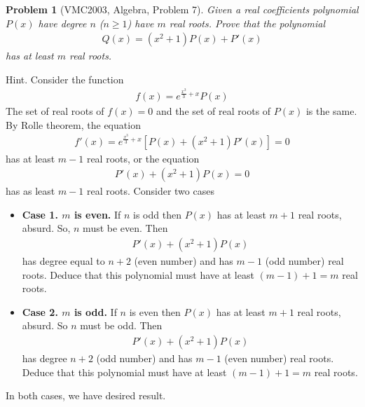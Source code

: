 \documentclass{article}
\newtheorem{problem}{Problem}
\begin{document}
\begin{problem}[VMC2003, Algebra, Problem 7]
	Given a real coefficients polynomial $P(x)$ have degree $n$ ($n \ge 1$) have $m$ real roots. Prove that the polynomial
	\begin{align}
		Q\left( x \right) = \left( {{x^2} + 1} \right)P\left( x \right) + P'\left( x \right)
	\end{align}
	has at least $m$ real roots.
\end{problem}
{\sf Hint.} Consider the function
\begin{align}
	f\left( x \right) = {e^{\frac{{{x^3}}}{3} + x}}P\left( x \right)
\end{align}
The set of real roots of $f(x)=0$ and the set of real roots of $P(x)$ is the same. By Rolle theorem, the equation 
\begin{align}
	f'\left( x \right) = {e^{\frac{{{x^3}}}{3} + x}}\left[ {P\left( x \right) + \left( {{x^2} + 1} \right)P'\left( x \right)} \right] = 0
\end{align}
has at least $m-1$ real roots, or the equation
\begin{align}
	P'\left( x \right) + \left( {{x^2} + 1} \right)P\left( x \right) = 0
\end{align}
has as least $m-1$ real roots. Consider two cases
\begin{itemize}
	\item \textbf{Case 1. $m$ is even.} If $n$ is odd then $P(x)$ has at least $m+1$ real roots, absurd. So, $n$ must be even. Then 
	\begin{align}
		P'\left( x \right) + \left( {{x^2} + 1} \right)P\left( x \right)
	\end{align}
	has degree equal to $n+2$ (even number) and has $m-1$ (odd number) real roots. Deduce that this polynomial must have at least $(m-1)+1=m$ real roots.
	\item \textbf{Case 2. $m$ is odd. } If $n$ is even then $P(x)$ has at least $m+1$ real roots, absurd. So $n$ must be odd. Then
	\begin{align}
		P'\left( x \right) + \left( {{x^2} + 1} \right)P\left( x \right)
	\end{align}
	has degree $n+2$ (odd number) and has $m-1$ (even number) real roots. Deduce that this polynomial must have at least $(m-1)+1=m$ real roots.
\end{itemize}
In both cases, we have desired result.
\end{document}
